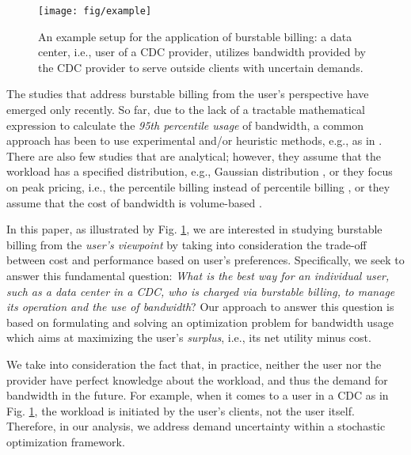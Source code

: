 \documentclass[10pt,journal,compsoc]{IEEEtran}
\begin{document}
\begin{figure}[t]
	\centering
	\texttt{[image: fig/example]}
	\caption{An example setup for the application of burstable billing: a data center, i.e., user of a CDC provider, utilizes bandwidth provided by the CDC provider to serve outside clients with uncertain demands.} \vspace{-0.2cm}\label{fig:example}
\end{figure}




The studies that address burstable billing from the user's perspective have emerged only recently. So far, due to the lack of a tractable mathematical expression to calculate the \emph{95th percentile usage} of bandwidth, a common approach has been to use experimental and/or heuristic methods, e.g., as in \cite{Traverso2015,Golubchik2013,Laoutaris2011, Nandagopal2012, Marcon2011, Stanojevic2011}. There are also few studies that are analytical; however, they assume that the workload has a specified distribution, e.g., Gaussian distribution \cite{Xu2012}, or they focus on peak pricing, i.e., the  percentile billing instead of  percentile billing \cite{Zhang2014}, or they assume that the cost of bandwidth is volume-based \cite{Xu2013,Xiang2014a}.




In this paper, as illustrated by Fig. \ref{fig:example},  we are interested in studying burstable billing from the \emph{user's viewpoint} by taking into consideration the trade-off between cost and performance based on user's preferences. Specifically, we seek to answer this fundamental question: \emph{What is the best way for an individual user, such as a data center in a CDC, who is charged via burstable billing, to manage its operation and the use of bandwidth}? Our approach to answer this question is based on formulating and solving an optimization problem for bandwidth usage which aims at maximizing the user's \emph{surplus}, i.e., its net utility minus cost.


We take into consideration the fact that, in practice, neither the user nor the provider have perfect knowledge about the workload, and thus the demand for bandwidth in the future. For example, when it comes to a user in a CDC as in Fig. \ref{fig:example}, the workload is initiated by the user's clients, not the user itself. Therefore, in our analysis, we address demand uncertainty within a stochastic optimization framework.
\end{document}
